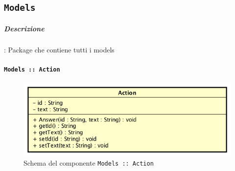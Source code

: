 \documentclass[../DefinizioneDiProdotto_v3.0.0.tex]{subfiles}
\begin{document}
	\newpage
	\subsection{\texttt{Models}}
		\subparagraph{Descrizione}: Package che contiene tutti i models


	\paragraph{\texttt{Models :: Action}}
	\acapo
	\begin{figure}[!h]
		\centering
		\includegraphics[scale=0.7]{Architettura/Front-End/Models/Action.png}
		\caption{Schema del componente \texttt{Models :: Action}}
	\end{figure}
\end{document}
